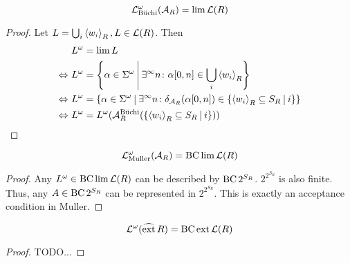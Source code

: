 \begin{lemma}
\label{gen:lang_omega_buechi}
\[ \mathcal{L}^\omega_{\text{Büchi}}(\mathcal{A}_R) = \lim \mathcal{L}(R) \]
\begin{proof}
Let $L = \bigcup_i \left< w_i\right>_R, L \in \mathcal{L}(R)$. Then
\begin{align*}
& L^\omega = \lim L \\
\Leftrightarrow \ & L^\omega = \Set{\alpha \in \Sigma^\omega}{\exists^\infty n \colon \alpha[0,n] \in \bigcup_i \left< w_i\right>_R} \\
\Leftrightarrow \ & L^\omega = \Set{\alpha \in \Sigma^\omega}{\exists^\infty n \colon \delta_{\A_R}(\alpha[0,n]) \in \Set{\left< w_i\right>_R \subseteq S_R}{i}} \\
\Leftrightarrow \ & L^\omega = L^\omega(\A^{\text{Büchi}}_R(\Set{\left< w_i\right>_R \subseteq S_R}{i}))
\end{align*}
\end{proof}
\end{lemma}

\begin{lemma}
\label{gen:lang_omega_muller}
\[ \mathcal{L}^\omega_{\text{Muller}}(\mathcal{A}_R) = \operatorname{BC} \lim \mathcal{L}(R) \]
\begin{proof}
Any $L^\omega \in \operatorname{BC} \lim \mathcal{L}(R)$ can be described by $\operatorname{BC} 2^{S_R}$. $2^{2^{S_R}}$ is also finite. Thus, any $A \in \operatorname{BC} 2^{S_R}$ can be represented in $2^{2^{S_R}}$. This is exactly an acceptance condition in Muller.
\end{proof}
\end{lemma}

\begin{lemma}
\label{gen:Romega=BCextR}
\[ \mathcal{L}^\omega(\operatorname{\widehat{ext}} R) = \operatorname{BC} \operatorname{ext} \mathcal{L}(R) \]
\begin{proof}
TODO...
\end{proof}
\end{lemma}

